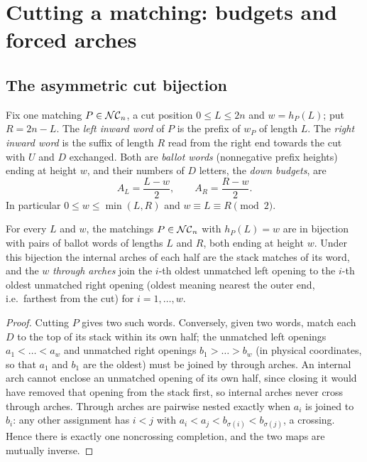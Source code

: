 \section{Cutting a matching: budgets and forced arches}
\label{sec:cut}

\subsection{The asymmetric cut bijection}

Fix one matching $P\in\mathcal{NC}_n$, a cut position $0\le L\le2n$ and $w=h_P(L)$; put
$R=2n-L$. The \emph{left inward word} of $P$ is the prefix of $w_P$ of length
$L$. The \emph{right inward word} is the suffix of length $R$ read from the right
end towards the cut with $U$ and $D$ exchanged. Both are \emph{ballot words}
(nonnegative prefix heights) ending at height $w$, and their numbers of $D$
letters, the \emph{down budgets}, are
\begin{equation}
\label{eq:budgets}
 A_L=\frac{L-w}{2},\qquad A_R=\frac{R-w}{2}.
\end{equation}
In particular $0\le w\le\min(L,R)$ and $w\equiv L\equiv R\pmod2$.

\begin{lemma}
\label{lem:cut}
\leanok
{}
For every $L$ and $w$, the matchings $P\in\mathcal{NC}_n$ with $h_P(L)=w$ are in
bijection with pairs of ballot words of lengths $L$ and $R$, both ending at
height $w$. Under this bijection the internal arches of each half are the stack
matches of its word, and the $w$ \emph{through arches} join the $i$-th oldest
unmatched left opening to the $i$-th oldest unmatched right opening
(oldest meaning nearest the outer end, i.e.\ farthest from the cut) for
$i=1,\dots,w$.
\end{lemma}

\begin{proof}
\leanok
Cutting $P$ gives two such words. Conversely, given two words, match each $D$ to
the top of its stack within its own half; the unmatched left openings
$a_1<\dots<a_w$ and unmatched right openings $b_1>\dots>b_w$ (in physical
coordinates, so that $a_1$ and $b_1$ are the oldest) must be joined by through
arches. An internal arch cannot enclose an unmatched opening of its own half,
since closing it would have removed that opening from the stack first, so
internal arches never cross through arches. Through arches are pairwise nested
exactly when $a_i$ is joined to $b_i$: any other assignment has $i<j$ with
$a_i<a_j<b_{\sigma(i)}<b_{\sigma(j)}$, a crossing. Hence there is exactly one
noncrossing completion, and the two maps are mutually inverse.
\end{proof}

